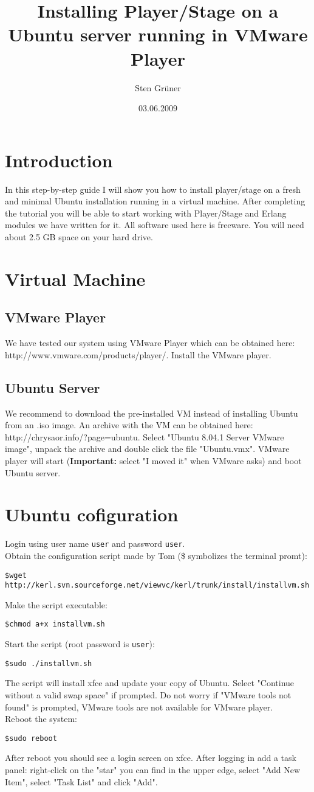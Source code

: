 \documentclass[a4paper,11pt,dvips]{article}
\title{Installing Player/Stage on a Ubuntu server running in VMware Player}
\author{Sten Gr\"{u}ner}
\date{03.06.2009}
\begin{document}
\newcommand{\prompt}[1]{
	\begin{center}
	\texttt{\$#1}
	\end{center}
}

\maketitle

\section{Introduction}
In this step-by-step guide I will show you how to install player/stage on a fresh and minimal Ubuntu installation running in a virtual machine. After completing the tutorial you will be able to start working with Player/Stage and Erlang modules we have written for it. All software used here is freeware. You will need about 2.5 GB space on your hard drive.

\section{Virtual Machine}
\subsection{VMware Player}
We have tested our system using VMware Player which can be obtained here: http://www.vmware.com/products/player/. Install the VMware player.
\subsection{Ubuntu Server}
We recommend to download the pre-installed VM instead of installing Ubuntu from an .iso image. An archive with the VM can be obtained here: \\ http://chrysaor.info/?page=ubuntu. Select "Ubuntu 8.04.1 Server VMware image", unpack the archive and double click the file "Ubuntu.vmx". VMware player will start (\textbf{Important:} select "I moved it" when VMware asks) and boot Ubuntu server.

\section{Ubuntu cofiguration}
Login using user name \texttt{user} and password \texttt{user}. 
\\Obtain the configuration script made by Tom (\$ symbolizes the terminal promt): 
\prompt{wget http://kerl.svn.sourceforge.net/viewvc/kerl/trunk/install/installvm.sh}
Make the script executable:
\prompt{chmod a+x installvm.sh}
Start the script (root password is \texttt{user}):
\prompt{sudo ./installvm.sh}
The script will install xfce and update your copy of Ubuntu. Select "Continue without a valid swap space" if prompted. Do not worry if "VMware tools not found" is prompted, VMware tools are not available for VMware player.
\\
Reboot the system:
\prompt{sudo reboot}
After reboot you should see a login screen on xfce. After logging in add a task panel: right-click on the "star" you can find in the upper edge, select "Add New Item", select "Task List" and click "Add".
\end{document}
